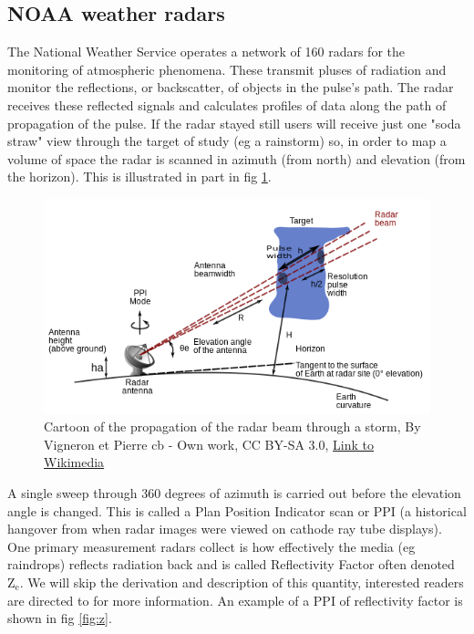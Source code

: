 \documentclass[twocol]{ametsoc}
\begin{document}
\subsection{NOAA weather radars}
\label{ssec:nexrad}
The National Weather Service operates a network of 160 radars for the monitoring of atmospheric phenomena. 
These transmit pluses of radiation and monitor the reflections, or backscatter, of objects in the pulse's path. The
 radar receives these reflected signals and calculates profiles of data along the path of propagation of the pulse. 
 If the radar stayed still users will receive just one "soda straw" view through the target of study (eg a rainstorm) 
 so, in order to map a volume of space the radar is scanned in azimuth (from north) and elevation (from the horizon).
 This is illustrated in part in fig \ref{fig:radar}. 
\begin{figure}[h]
    \centering
    \includegraphics[width=0.95\columnwidth]{radar_prop.png}
    \caption{Cartoon of the propagation of the radar beam through a storm, By Vigneron et Pierre cb - Own work, 
    CC BY-SA 3.0, \href{https://commons.wikimedia.org/w/index.php?curid=4177376}{Link to Wikimedia}}
    \label{fig:radar}
\end{figure}

A single sweep through 360 degrees of azimuth is carried out before the elevation angle is changed. This is called a 
Plan Position Indicator scan or PPI (a historical hangover from when radar images were viewed on cathode ray tube 
displays). One primary measurement radars collect is how effectively the media (eg raindrops) reflects radiation back
 and is called Reflectivity Factor often denoted $\mathrm{Z_e}$. We will skip the derivation and description of this 
 quantity, interested readers are directed to \cite{doviak1984doppler} for more information. An example of a PPI of reflectivity factor is 
 shown in fig \ref{fig:z}. 
\end{document}
